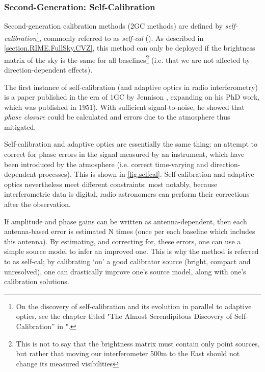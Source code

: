 \subsubsection{Second-Generation: Self-Calibration}\label{section.calibration.2gc}

\pg
Second-generation calibration methods (2GC methods) are defined by \emph{self-calibration}\footnote{On the discovery of self-calibration and its evolution in parallel to adaptive optics, see the chapter titled "The Almost Serendipitous Discovery of Self-Calibration'' in "\href{http://library.nrao.edu/public/collection/02000000000280.pdf}{\citep{serendipitous}}.}, commonly referred to as \emph{self-cal} (). As described in \cref{section.RIME.FullSky.CVZ}, this method can only be deployed if the brightness matrix of the sky is the same for all baselines\footnote{This is not to say that the brightness matrix must contain only point sources, but rather that moving our interferometer 500m to the East should not change its measured visibilities} (i.e. that we are not affected by direction-dependent effects).

\pg
The first instance of self-calibration (and adaptive optics in radio interferometry) is a paper published in the era of 1GC by Jennison , expanding on his PhD work, which was published in 1951). With sufficient signal-to-noise, he showed that \emph{phase closure} could be calculated and errors due to the atmosphere thus mitigated.

\pg
Self-calibration and adaptive optics are essentially the same thing: an attempt to correct for phase errors in the signal measured by an instrument, which have been introduced by the atmosphere (i.e. correct time-varying and direction-dependent processes). This is shown in \cref{fig.selfcal}. Self-calibration and adaptive optics nevertheless meet different constraints: most notably, because interferometric data is digital, radio astronomers can perform their corrections after the observation.

\pg
If amplitude and phase gains can be written as antenna-dependent, then each antenna-based error is estimated N times (once per each baseline which includes this antenna). By estimating, and correcting for, these errors, one can use a simple source model to infer an improved one. This is why the method is referred to as self-cal; by calibrating `on' a good calibrator source (bright, compact and unresolved), one can drastically improve one's source model, along with one's calibration solutions.


